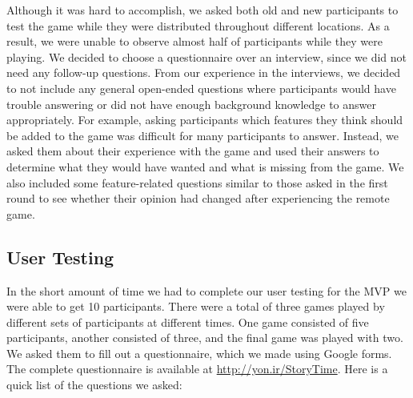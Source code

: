 \documentclass{sigchi}
\begin{document}
Although it was hard to accomplish, we asked both old and new participants to test the game while they were distributed throughout different locations. As a result, we were unable to observe almost half of participants while they were playing. We decided to choose a questionnaire over an interview, since we did not need any follow-up questions. From our experience in the interviews, we decided to not include any general open-ended questions where participants would have trouble answering or did not have enough background knowledge to answer appropriately. For example, asking participants which features they think should be added to the game was difficult for many participants to answer. Instead, we asked them about their experience with the game and used their answers to determine what they would have wanted and what is missing from the game. We also included some feature-related questions similar to those asked in the first round to see whether their opinion had changed after experiencing the remote game.

\subsection{User Testing}
In the short amount of time we had to complete our user testing for the MVP we were able to get 10 participants. There were a total of three games played by different sets of participants at different times. One game consisted of five participants, another consisted of three, and the final game was played with two. We asked them to fill out a questionnaire, which we made using Google forms. The complete questionnaire is available at \url{http://yon.ir/StoryTime}. Here is a quick list of the questions we asked: 
\end{document}
